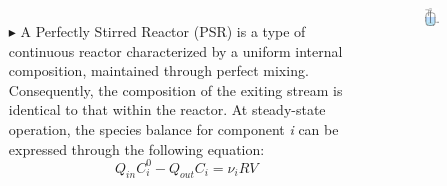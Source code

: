\documentclass[xcolor={dvipsnames,rgb}, aspectratio=169]{beamer}
\begin{document}
\begin{frame}{}
   \begin{columns}
      \begin{itemize}
         \item[$\blacktriangleright$] A Perfectly Stirred Reactor (PSR) is a type of
            continuous reactor characterized by a uniform internal composition,
            maintained through perfect mixing. Consequently, the composition of the
            exiting stream is identical to that within the reactor. At steady-state
            operation, the species balance for component \textit{i} can be expressed
            through the following equation:
            \begin{equation*}
               Q_{in}C_{i}^{0} - Q_{out}C_{i} = \nu_{i}RV
            \end{equation*}
      \end{itemize}
      \begin{figure}
         \centering
         \includegraphics[width=0.6\textwidth]{Figures/proxy.jpeg}
      \end{figure}
   \end{columns}
\end{frame}
\end{document}
